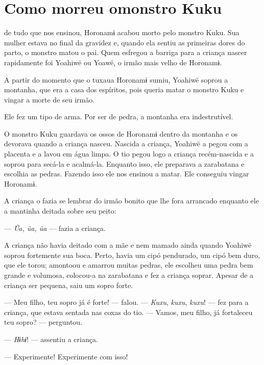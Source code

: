 \chapter[Como morreu o monstro Kuku]{Como morreu o\break monstro Kuku}

 de tudo que nos ensinou, Horonamɨ acabou morto pelo monstro Kuku.
Sua mulher estava no final da gravidez e, quando ela sentiu as primeiras
dores do parto, o monstro matou o pai. Quem esfregou a barriga para a
criança nascer rapidamente foi Yoahiwë ou Yoawë, o irmão mais velho de
Horonamɨ. 

A partir do momento que o tuxaua Horonamɨ sumiu, Yoahiwë soprou a
montanha, que era a casa dos espíritos, pois queria matar o monstro Kuku
e vingar a morte de seu irmão. 

Ele fez um tipo de arma. Por ser de pedra, a montanha era
indestrutível. 

O monstro Kuku guardava os ossos de Horonamɨ dentro da montanha e os
devorava quando a criança nasceu. Nascida a criança, Yoahiwë a pegou com
a placenta e a lavou em água limpa. O tio pegou logo a criança
recém-nascida e a soprou para secá-la e acalmá-la. Enquanto isso, ele
preparava a zarabatana e escolhia as pedras. Fazendo isso ele nos
ensinou a matar. Ele conseguiu vingar Horonamɨ. 

A criança o fazia se lembrar do irmão bonito que lhe fora arrancado
enquanto ele a mantinha deitada sobre seu peito:

--- \textit{Ũa, ũa, ũa} --- fazia a criança. 

A criança não havia deitado com a mãe e nem mamado ainda quando Yoahiwë
soprou fortemente sua boca. Perto, havia um cipó pendurado, um cipó bem
duro, que ele torou; amontoou e amarrou muitas pedras, ele escolheu uma
pedra bem grande e volumosa, colocou-a na zarabatana e fez a criança
soprar. Apesar de a criança ser pequena, saiu um sopro forte. 

--- Meu filho, teu sopro já é forte! --- falou. --- \textit{Kuxu}, \textit{kuxu},
\textit{kuxu}! --- fez para a criança, que estava sentada nas coxas do
tio. --- Vamos, meu filho, já fortaleceu teu sopro? --- perguntou.

--- \textit{Hɨhɨ}! --- assentiu a criança. 

--- Experimente! Experimente com isso! 


